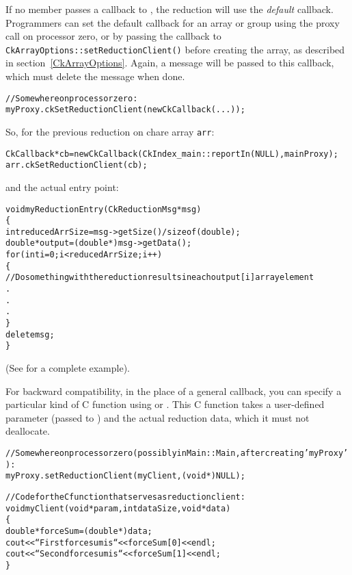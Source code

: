 If no member passes a callback to , the reduction will use
the {\em default} callback. Programmers can set the default callback for an array or group
using the  proxy call on processor zero, or
by passing the callback to {\tt CkArrayOptions::setReductionClient()}
before creating the array, as described in section~\ref{CkArrayOptions}.
Again, a  message will be passed to this callback,
which must delete the message when done.

\begin{alltt}
    // Somewhere on processor zero:
    myProxy.ckSetReductionClient(new CkCallback(...));
\end{alltt}

So, for the previous reduction on chare array {\tt arr}:
\begin{alltt}
    CkCallback *cb = new CkCallback(CkIndex_main::reportIn(NULL),  mainProxy);
    arr.ckSetReductionClient(cb);
\end{alltt}

and the actual entry point:

\begin{alltt}
void myReductionEntry(CkReductionMsg *msg)
\{
  int reducedArrSize=msg->getSize() / sizeof(double);
  double *output=(double *) msg->getData();
  for(int i=0 ; i<reducedArrSize ; i++)
  \{
   // Do something with the reduction results in each output[i] array element
   .
   .
   .
  \}
  delete msg;
\}
\end{alltt}

(See  for a complete example).

For backward compatibility, in the place of a general callback, you can
specify a particular kind of C function using 
or .  This C function takes a user-defined
parameter (passed to ) and the actual reduction data,
which it must not deallocate.

\begin{alltt}
  // Somewhere on processor zero (possibly in Main::Main, after creating 'myProxy'):
  myProxy.setReductionClient(myClient,(void *)NULL);

  // Code for the C function that serves as reduction client:
  void myClient(void *param,int dataSize,void *data)
  \{
    double *forceSum=(double *)data;
    cout<<``First force sum is ``<<forceSum[0]<<endl;
    cout<<``Second force sum is ``<<forceSum[1]<<endl;
  \}
\end{alltt}

